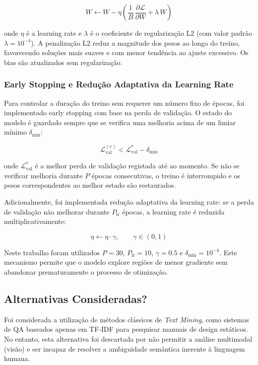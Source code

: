 \documentclass[a4paper,12pt]{scrreprt}
\begin{document}
            \[
            W \leftarrow W - \eta \left(\frac{1}{B}\,\frac{\partial \mathcal{L}}{\partial W} + \lambda\, W\right)
            \]

            onde $\eta$ é a learning rate e $\lambda$ é o coeficiente de regularização L2 (com valor padrão $\lambda = 10^{-4}$). A penalização L2 reduz a magnitude dos pesos ao longo do treino, favorecendo soluções mais suaves e com menor tendência ao ajuste excessivo. Os bias são atualizados sem regularização.

            \subsubsection*{Early Stopping e Redução Adaptativa da Learning Rate}

            Para controlar a duração do treino sem requerer um número fixo de épocas, foi implementado early stopping com base na perda de validação. O estado do modelo é guardado sempre que se verifica uma melhoria acima de um limiar mínimo $\delta_{\min}$:

            \[
            \mathcal{L}_{\mathrm{val}}^{(e)} < \mathcal{L}_{\mathrm{val}}^{*} - \delta_{\min}
            \]

            onde $\mathcal{L}_{\mathrm{val}}^{*}$ é a melhor perda de validação registada até ao momento. Se não se verificar melhoria durante $P$ épocas consecutivas, o treino é interrompido e os pesos correspondentes ao melhor estado são restaurados.

            Adicionalmente, foi implementada redução adaptativa da learning rate: se a perda de validação não melhorar durante $P_{\mathrm{lr}}$ épocas, a learning rate é reduzida multiplicativamente:

            \[
            \eta \leftarrow \eta \cdot \gamma, \qquad \gamma \in (0,1)
            \]

            Neste trabalho foram utilizados $P = 30$, $P_{\mathrm{lr}} = 10$, $\gamma = 0.5$ e $\delta_{\min} = 10^{-4}$. Este mecanismo permite que o modelo explore regiões de menor gradiente sem abandonar prematuramente o processo de otimização.

    \subsection{Alternativas Consideradas?}
        Foi considerada a utilização de métodos clássicos de \textit{Text Mining}, como sistemas de QA baseados apenas em TF-IDF para pesquisar manuais de design estáticos. No entanto, esta alternativa foi descartada por não permitir a análise multimodal (visão) e ser incapaz de resolver a ambiguidade semântica inerente à linguagem humana.
\end{document}
